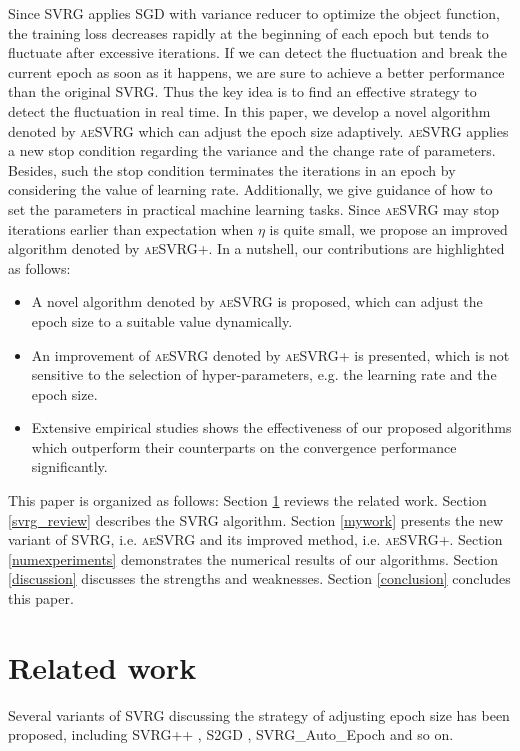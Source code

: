 \documentclass[conference]{IEEEtran}
\begin{document}
Since SVRG applies SGD with variance reducer to optimize the object function, the training loss decreases rapidly at the beginning of each epoch but tends to fluctuate after excessive iterations. If we can detect the fluctuation and break the current epoch as soon as it happens, we are sure to achieve a better performance than the original SVRG. Thus the key idea is to find an effective strategy to detect the fluctuation in real time. In this paper, we develop a novel algorithm denoted by \textsc{aeSVRG} which can adjust the epoch size adaptively.  \textsc{aeSVRG} applies a new stop condition regarding the variance and the change rate of parameters. Besides, such the stop condition terminates the iterations in an epoch by considering the value of learning rate.  Additionally, we give guidance of how to set the parameters in practical machine learning tasks. Since \textsc{aeSVRG} may stop iterations earlier than expectation when $\eta$ is quite small, we propose an improved algorithm denoted by \textsc{aeSVRG+}. In a nutshell, our contributions are highlighted as follows:
\begin {itemize}
\item  A novel algorithm denoted by \textsc{aeSVRG} is proposed, which can adjust the epoch size to a suitable value dynamically.
\item An improvement of \textsc{aeSVRG} denoted by \textsc{aeSVRG+}  is   presented, which  is not sensitive to the selection of hyper-parameters, e.g. the learning rate and the epoch size.
\item Extensive empirical studies shows the effectiveness of our proposed algorithms which outperform their counterparts on the convergence performance significantly.
\end {itemize}

This paper is organized as follows: Section \ref{sectiove_related_work} reviews the related work. Section \ref{svrg_review} describes the SVRG algorithm. Section \ref{mywork} presents the new variant of SVRG, i.e. \textsc{aeSVRG} and its improved method, i.e. \textsc{aeSVRG+}. Section \ref{numexperiments} demonstrates the numerical results of our algorithms. Section \ref{discussion} discusses the strengths and weaknesses.
Section \ref{conclusion} concludes this paper.



\section{Related work}
\label{sectiove_related_work}
Several variants of SVRG  discussing the strategy of adjusting epoch size has been proposed, including SVRG++ \citep{Allen2015Improved}, S2GD \citep{Richtarik:2013te}, SVRG\_Auto\_Epoch \citep{Allen2015Improved} and so on. 
\end{document}
